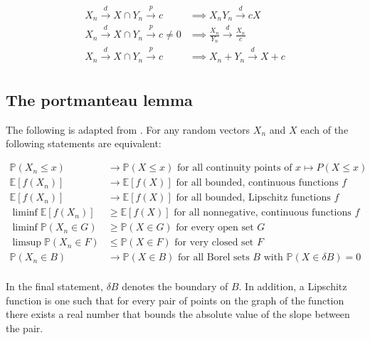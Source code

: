 \documentclass{report}
\begin{document}
\begin{equation}\label{eq:lst-slutsky}
    \begin{aligned}
      X_n \overset{d}{\to} X \cap Y_n \overset{p}{\to} c &\implies X_nY_n \overset{d}{\to} cX \\
      X_n \overset{d}{\to} X \cap Y_n \overset{p}{\to} c \neq 0 &\implies \frac{X_n}{Y_n} \overset{d}{\to} \frac{X_n}{c} \\
      X_n \overset{d}{\to} X \cap Y_n \overset{p}{\to} c &\implies X_n + Y_n \overset{d}{\to} X + c \\
    \end{aligned}
\end{equation}

\subsection{The portmanteau lemma}

The following is adapted from \cite[Chapter~2.1]{van_der_vaart_asymptotic_1998}. For any random vectors $X_n$ and $X$ each of the following statements are equivalent:

\begin{equation}\label{eq:lst-portmanteau-lemma}
    \begin{aligned}
        \mathbb{P}(X_n \leq x) &\to \mathbb{P}(X \leq x) \text{ for all continuity points of } x \mapsto P(X \leq x) \\
        \mathbb{E}[f(X_n)] &\to \mathbb{E}[f(X)] \text{ for all bounded, continuous functions } f \\
        \mathbb{E}[f(X_n)] &\to \mathbb{E}[f(X)] \text{ for all bounded, Lipschitz functions } f \\
        \liminf \mathbb{E}[f(X_n)] &\geq \mathbb{E}[f(X)] \text{ for all nonnegative, continuous functions } f \\
        \liminf \mathbb{P}(X_n \in G) &\geq \mathbb{P}(X \in G) \text{ for every open set } G \\
        \limsup \mathbb{P}(X_n \in F) &\leq \mathbb{P}(X \in F) \text{ for very closed set } F \\
        \mathbb{P}(X_n \in B) &\to \mathbb{P}(X \in B) \text{ for all Borel sets } B \text{ with } \mathbb{P}(X \in \delta B) = 0 \\
    \end{aligned}
\end{equation}

In the final statement, $\delta B$ denotes the boundary of $B$. In addition, a Lipschitz function is one such that for every pair of points on the graph of the function there exists a real number that bounds the absolute value of the slope between the pair. 
\end{document}
